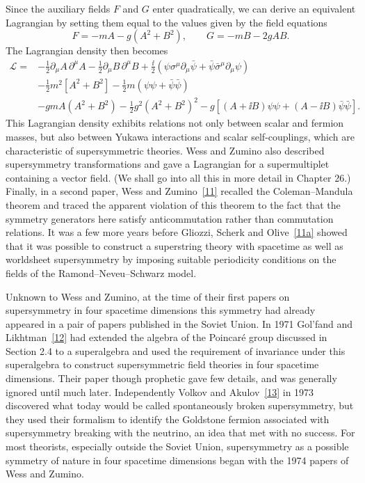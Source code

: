 Since the auxiliary fields \(F\) and \(G\) enter quadratically, we can derive
an equivalent Lagrangian by setting them equal to the values given by the
field equations
\begin{equation}
F=-mA-g(A^2+B^2),
\qquad
G=-mB-2gAB.
\tag{24.2.10}\label{eq:24.2.10}
\end{equation}
The Lagrangian density then becomes
\begin{equation}
\begin{aligned}
\mathcal L={}&
-\frac12\partial_\mu A\,\partial^\mu A
-\frac12\partial_\mu B\,\partial^\mu B
+\frac{\ii}{2}\left(
  \psi\sigma^\mu\partial_\mu\bar\psi
  +\bar\psi\bar\sigma^\mu\partial_\mu\psi\right)
\\
&-\frac12m^2\left[A^2+B^2\right]
  -\frac12m(\psi\psi+\bar\psi\bar\psi)
\\
&-gmA(A^2+B^2)-\frac12g^2(A^2+B^2)^2
-g\left[(A+\ii B)\psi\psi+(A-\ii B)\bar\psi\bar\psi\right].
\end{aligned}
\tag{24.2.11}\label{eq:24.2.11}
\end{equation}
This Lagrangian density exhibits relations not only between scalar and
fermion masses, but also between Yukawa interactions and scalar
self-couplings, which are characteristic of supersymmetric theories. Wess and
Zumino also described supersymmetry transformations and gave a Lagrangian for
a supermultiplet containing a vector field. (We shall go into all this in more
detail in Chapter 26.) Finally, in a second paper, Wess and
Zumino~\hyperref[ch24-ref-11]{[11]} recalled the Coleman--Mandula theorem and
traced the apparent violation of this theorem to the fact that the symmetry
generators here satisfy anticommutation rather than commutation relations. It
was a few more years before Gliozzi, Scherk and
Olive~\hyperref[ch24-ref-11a]{[11a]} showed that it was possible to construct
a superstring theory with spacetime as well as worldsheet supersymmetry by
imposing suitable periodicity conditions on the fields of the
Ramond--Neveu--Schwarz model.

Unknown to Wess and Zumino, at the time of their first papers on supersymmetry
in four spacetime dimensions this symmetry had already appeared in a pair of
papers published in the Soviet Union. In 1971 Gol'fand and
Likhtman~\hyperref[ch24-ref-12]{[12]} had extended the algebra of the Poincaré
group discussed in Section 2.4 to a superalgebra and used the requirement of
invariance under this superalgebra to construct supersymmetric field theories
in four spacetime dimensions. Their paper though prophetic gave few details,
and was generally ignored until much later. Independently Volkov and
Akulov~\hyperref[ch24-ref-13]{[13]} in 1973 discovered what today would be
called spontaneously broken supersymmetry, but they used their formalism to
identify the Goldstone fermion associated with supersymmetry breaking with
the neutrino, an idea that met with no success. For most theorists, especially
outside the Soviet Union, supersymmetry as a possible symmetry of nature in
four spacetime dimensions began with the 1974 papers of Wess and Zumino.
